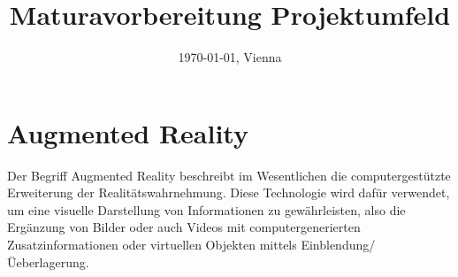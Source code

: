 \documentclass[11pt, a4paper]{article}
\title{Maturavorbereitung Projektumfeld \\ \VARtitle}
\author{\VARauthor}
\date{\today{}, Vienna}
\begin{document}


\maketitle
\newpage
\tableofcontents
\newpage


\section{Augmented Reality}
Der Begriff Augmented Reality beschreibt im Wesentlichen die computergest\"utzte Erweiterung der Realit\"atswahrnehmung. Diese Technologie wird daf\"ur verwendet, um eine visuelle Darstellung von Informationen zu gew\"ahrleisten, also die Erg\"anzung von Bilder oder auch Videos mit computergenerierten Zusatzinformationen oder virtuellen Objekten mittels Einblendung/\"Ueberlagerung.\cite{erweitert-real}
\\
\end{document}

